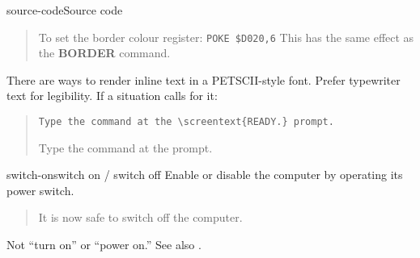\begin{sgentry}{source-code}{Source code}
\begin{quote}
        \hrulefill

        To set the border colour register: \texttt{POKE \$D020,6} This has the same effect as the \textbf{BORDER} command.
    \end{quote}

    There are ways to render inline text in a PETSCII-style font. Prefer typewriter text for legibility. If a situation calls for it:

    \begin{quote}
        \texttt{Type the command at the {\textbackslash}screentext\{READY.\} prompt.}

        \hrulefill

        Type the command at the  prompt.
    \end{quote}
\end{sgentry}

\begin{sgentry}{switch-on}{switch on / switch off}
    Enable or disable the computer by operating its power switch.

    \begin{quote}
        It is now safe to switch off the computer.
    \end{quote}

    Not ``turn on'' or ``power on.'' See also .
\end{sgentry}


